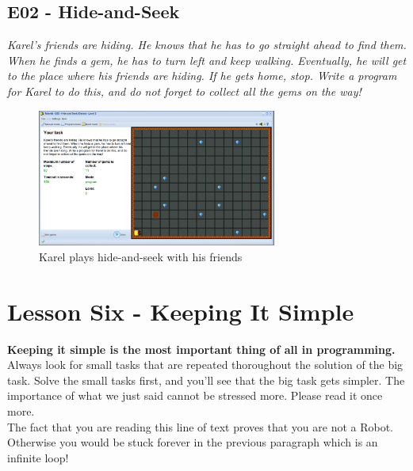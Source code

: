 \documentclass[article,A4,12pt]{llncs}
\begin{document}
\subsection{E02 - Hide-and-Seek}

{\em Karel's friends are hiding. He knows that he has to go straight 
ahead to find them. When he finds a gem, he has to turn left and keep 
walking. Eventually, he will get to the place where his friends are 
hiding. If he gets home, stop. Write a program for Karel to do this, 
and do not forget to collect all the gems on the way!}\\[-7mm]

\begin{figure}[!ht]
\begin{center}
\includegraphics[width=0.7\textwidth]{img/e02.png}
\end{center}
\vspace{-4mm}
\caption{Karel plays hide-and-seek with his friends}
\label{fig:e02}
\vspace{-10mm}
\end{figure}
\noindent
\newpage

\section{Lesson Six - Keeping It Simple}

{\bf Keeping it simple is the most important thing of all in programming.} 
Always look for small tasks that are repeated thoroughout the 
solution of the big task. Solve the small tasks first, and you'll
see that the big task gets simpler. The importance of what we
just said cannot be stressed more. Please read it once more.\\

\noindent
The fact that you are reading this line of text proves that you are not a Robot.
Otherwise you would be stuck forever in the previous paragraph which is 
an infinite loop!\\
\end{document}
